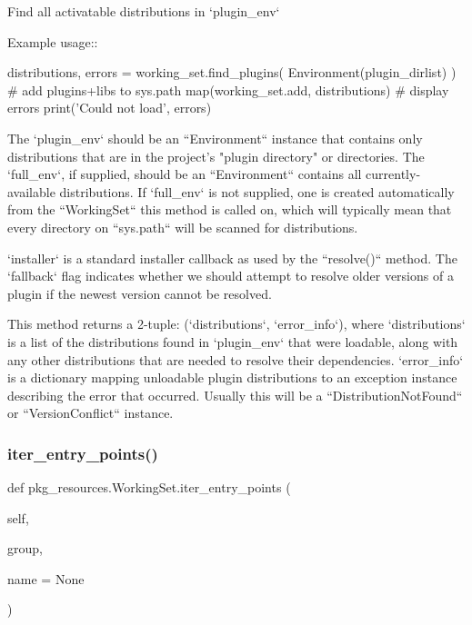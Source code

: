 \begin{DoxyVerb}Find all activatable distributions in `plugin_env`

Example usage::

    distributions, errors = working_set.find_plugins(
Environment(plugin_dirlist)
    )
    # add plugins+libs to sys.path
    map(working_set.add, distributions)
    # display errors
    print('Could not load', errors)

The `plugin_env` should be an ``Environment`` instance that contains
only distributions that are in the project's "plugin directory" or
directories. The `full_env`, if supplied, should be an ``Environment``
contains all currently-available distributions.  If `full_env` is not
supplied, one is created automatically from the ``WorkingSet`` this
method is called on, which will typically mean that every directory on
``sys.path`` will be scanned for distributions.

`installer` is a standard installer callback as used by the
``resolve()`` method. The `fallback` flag indicates whether we should
attempt to resolve older versions of a plugin if the newest version
cannot be resolved.

This method returns a 2-tuple: (`distributions`, `error_info`), where
`distributions` is a list of the distributions found in `plugin_env`
that were loadable, along with any other distributions that are needed
to resolve their dependencies.  `error_info` is a dictionary mapping
unloadable plugin distributions to an exception instance describing the
error that occurred. Usually this will be a ``DistributionNotFound`` or
``VersionConflict`` instance.
\end{DoxyVerb}
 \mbox{\label{classpkg__resources_1_1WorkingSet_a556736951f3aa317fa2d339d64e290ea}} 
\subsubsection{\texorpdfstring{iter\+\_\+entry\+\_\+points()}{iter\_entry\_points()}}
{\footnotesize\ttfamily def pkg\+\_\+resources.\+Working\+Set.\+iter\+\_\+entry\+\_\+points (\begin{DoxyParamCaption}\item[{}]{self,  }\item[{}]{group,  }\item[{}]{name = {\ttfamily None} }\end{DoxyParamCaption})}

